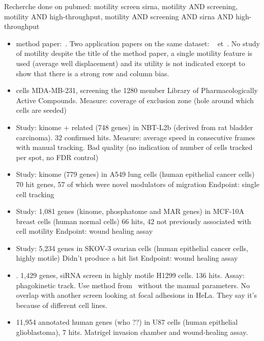 \documentclass[12pt]{article}
\begin{document}
Recherche done on pubmed: motility screen sirna, motility AND screening, motility AND high-throughput, motility AND screening AND sirna AND high-throughput
\begin{itemize}
\item method paper:~\cite{pmid25630981}. Two application papers on the same dataset: ~\cite{pmid23186832} et~\cite{pmid23251412}. No study of motility despite the title of the method paper, a single motility feature is used (average well displacement) and its utility is not indicated except to show that there is a strong row and column bias.

\item \cite{pmid24520372} cells MDA-MB-231, screening the 1280 member Library of Pharmacologically Active Compounds. Measure: coverage of exclusion zone (hole around which cells are seeded)

\item \cite{pmid25652422} Study: kinome + related (748 genes) in NBT-L2b (derived from rat bladder carcinoma). 32 confirmed hits. Measure: average speed in consecutive frames with manual tracking. Bad quality (no indication of number of cells tracked per spot, no FDR control)

\item \cite{pmid21423205} Study: kinome (779 genes) in A549 lung cells (human epithelial cancer cells)
70 hit genes, 57 of which were novel modulators of migration
Endpoint: single cell tracking
\item \cite{pmid19160483} Study: 1,081 genes (kinome, phosphatome and MAR genes) in MCF-10A breast cells (human normal cells)
66 hits, 42 not previously associated with cell motility
Endpoint: wound healing assay

\item \cite{pmid16537454} Study: 5,234 genes in SKOV-3 ovarian cells (human epithelial cancer cells, highly motile)
Didn't produce a hit list
Endpoint: wound healing assay

\item \cite{pmid25774502}. 1,429 genes, siRNA screen in highly motile H1299 cells. 136 hits. Assay: phagokinetic track. Use method from~\cite{pmid18213366} without the manual parameters. No overlap with another screen looking at focal adhesions in HeLa. They say it's because of different cell lines.

\item \cite{pmid23593504} 11,954 annotated human genes (who ??) in U87 cells (human epithelial glioblastoma), 7 hits. Matrigel invasion chamber and wound-healing assay.

\end{itemize}
~
\end{document}
